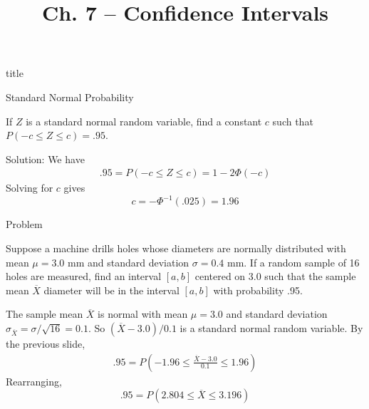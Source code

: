 \documentclass[handout]{beamer}
\title{Ch. 7 -- Confidence Intervals}
\begin{document}
\begin{frame}
\begin{beamercolorbox}[rounded=true,wd=\textwidth,center]{title}
\inserttitle
\end{beamercolorbox}
\end{frame} 

\begin{frame}{Standard Normal Probability}
\begin{block}{}
If $Z$ is a standard normal random variable, find a constant $c$ such that $P(-c \leq Z \leq c)=.95$.
\end{block}
\pause Solution: We have
\begin{align*}
.95 = P(-c \leq Z \leq c) = 1-2\Phi(-c)
\end{align*}
\pause Solving for $c$ gives
$$c = -\Phi^{-1}(.025) = 1.96$$
\end{frame}

\begin{frame}{Problem}
\begin{block}{}
Suppose a machine drills holes whose diameters are normally distributed with mean $\mu=3.0 $ mm and standard deviation $\sigma=0.4$ mm. If a random sample of 16 holes are measured, find an interval $[a,b]$ centered on 3.0 such that the sample mean $\overline{X}$ diameter will be in the interval $[a,b]$ with probability .95.
\end{block}
\pause The sample mean $\overline{X}$ is normal with mean $\mu=3.0$ and standard deviation $\sigma_{\overline X} = \sigma/\sqrt{16} = 0.1$. So $(\overline X-3.0)/0.1$ is a standard normal random variable. 
\pause By the previous slide,
\begin{align*}
.95 = P(-1.96 \leq \frac{\overline X-3.0}{0.1} \leq 1.96)
\end{align*}
\pause Rearranging,
$$.95 = P(2.804 \leq \overline{X} \leq 3.196)$$
\end{frame}
\end{document}
